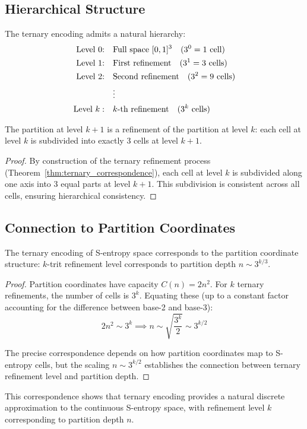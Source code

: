 \subsection{Hierarchical Structure}

\begin{definition}
\label{def:hierarchical_levels}
The ternary encoding admits a natural hierarchy:
\begin{align}
\text{Level 0:} \quad &\text{Full space } [0,1]^3 \quad (3^0 = 1 \text{ cell}) \label{eq:level_0} \\
\text{Level 1:} \quad &\text{First refinement} \quad (3^1 = 3 \text{ cells}) \label{eq:level_1} \\
\text{Level 2:} \quad &\text{Second refinement} \quad (3^2 = 9 \text{ cells}) \label{eq:level_2} \\
&\vdots \notag \\
\text{Level } k: \quad &k\text{-th refinement} \quad (3^k \text{ cells}) \label{eq:level_k}
\end{align}
\end{definition}

\begin{theorem}
\label{thm:hierarchical_consistency}
The partition at level $k+1$ is a refinement of the partition at level $k$: each cell at level $k$ is subdivided into exactly 3 cells at level $k+1$.
\end{theorem}

\begin{proof}
By construction of the ternary refinement process (Theorem~\ref{thm:ternary_correspondence}), each cell at level $k$ is subdivided along one axis into 3 equal parts at level $k+1$. This subdivision is consistent across all cells, ensuring hierarchical consistency.
\end{proof}

\subsection{Connection to Partition Coordinates}

\begin{theorem}
\label{thm:ternary_partition}
The ternary encoding of S-entropy space corresponds to the partition coordinate structure: $k$-trit refinement level corresponds to partition depth $n \sim 3^{k/3}$.
\end{theorem}

\begin{proof}
Partition coordinates have capacity $C(n) = 2n^2$. For $k$ ternary refinements, the number of cells is $3^k$. Equating these (up to a constant factor accounting for the difference between base-2 and base-3):
\begin{equation}
2n^2 \sim 3^k \implies n \sim \sqrt{\frac{3^k}{2}} \sim 3^{k/2}
\end{equation}

The precise correspondence depends on how partition coordinates map to S-entropy cells, but the scaling $n \sim 3^{k/2}$ establishes the connection between ternary refinement level and partition depth.
\end{proof}

This correspondence shows that ternary encoding provides a natural discrete approximation to the continuous S-entropy space, with refinement level $k$ corresponding to partition depth $n$.
